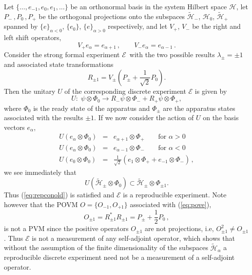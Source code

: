 \documentclass[12pt]{article}
\renewcommand{\dagger}{\ast}
\renewcommand{\a}{\alpha}
\newcommand{\lam}{\lambda}
\newcommand{\ot}{\otimes}
\renewcommand{\H}{\mbox{$\mathcal{H}$}}
\newcommand{\As}{{R}}
\newcommand{\E}{\mbox{$\mathscr{E}$}}
\newcommand{\Ex}{\mbox{$\mathcal{E}$}}
\begin{document}
Let $\{ \dots, e_{-1},e_0,e_1,\dots \}$ be an orthonormal basis in the
system Hilbert space \H, let $P_{-}\,,P_0\,, P_{+}$ be the orthogonal
projections onto the subspaces $\widetilde{\mathcal{H}}_{-}$, $\H_0$,
$\widetilde{\mathcal{H}}_{+}$ spanned by $\{e\}_{\a < 0}$, $\{e_0\}$,
$\{e\}_{\a >0}$ respectively, and let $V_+$, $V_-$ be the right and
left shift operators,
$$V_+ e_{\a} = e_{\a+1}\,, \qquad V_-e_\a = e_{\a-1}\,.$$
Consider the
strong formal experiment \Ex\ with the two possible results
$\lam_{\pm}=\pm 1$ and associated state transformations
\begin{equation}
R_{\pm1} = V_{\pm}(P_{\pm} +\frac{1}{\sqrt{2}}P_0).
\label{eq:pove}
\end{equation}
Then the unitary $U$ of the corresponding discrete experiment \E{} is
given by
$$
U: \;\psi \ot \Phi_0 \to R_{-}\psi \ot \Phi_{-} + R_{+}\psi \ot
\Phi_{+},$$
where $\Phi_0$ is the ready state of the apparatus and
$\Phi_{\pm}$ are the apparatus states associated with the results $\pm
1$.  If we now consider the action of $U$ on the basis vectors
$e_{\a}$,
\begin{eqnarray}
U(e_\a\ot\Phi_0)&=&e_{\a + 1}\ot \Phi_{+}\qquad \mbox{for $\a>0$}
\nonumber\\
U(e_\a\ot\Phi_0)&=&e_{\a - 1}\ot \Phi_{-}\qquad \mbox{for $\a
<0$}
\nonumber\\
U(e_0\ot\Phi_0)&=&
\frac{1}{\sqrt{2}}(e_1\ot\Phi_{+}
+e_{-1}\ot\Phi_{-})\, ,\nonumber
\end{eqnarray}
we see immediately that $$U(\widetilde{\mathcal{H}}_{\pm}\ot\Phi_0)
\subset \widetilde{\mathcal{H}}_{\pm}\ot\Phi_{\pm1}.$$
Thus
(\ref{eq:repconold}) is satisfied and \E{} is a reproducible
experiment.  Note however that the POVM $ O = \{ O_{-1}, O_{+1}\}$
associated with (\ref{eq:pove}),
$$
O_{\pm1} =\As_{\pm1}^{\dagger}\As_{\pm1} = P_{\pm} +
\frac{1}{2}P_0\,,
$$
is not a PVM since the positive operators $ O_{\pm 1}$ are not
projections, i.e, $ O_{\pm 1}^2 \ne O_{\pm 1}$.  Thus \E{} is not a
measurement of any self-adjoint operator, which shows that without the
assumption of the finite dimensionality of the subspaces
$\widetilde{\mathcal{H}}_{\a}$ a reproducible discrete experiment need
not be a measurement of a self-adjoint operator.
\end{document}
